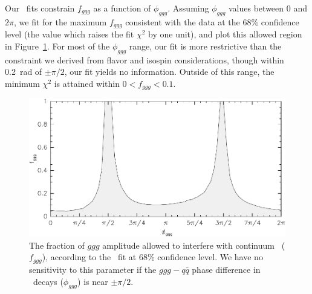 \documentclass{cornell}
\begin{document}
Our \us\ fits constrain $f_{ggg}$ as a function of $\phi_{ggg}$.
Assuming $\phi_{ggg}$ values between $0$ and $2\pi$, we fit for the
maximum $f_{ggg}$ consistent with the data at the 68\% confidence
level (the value which raises the fit $\chi^2$ by one unit), and plot
this allowed region in Figure~\ref{intconstraint}.  For most of the
$\phi_{ggg}$ range, our fit is more restrictive than the constraint we
derived from flavor and isospin considerations, though within 0.2~rad
of $\pm\pi/2$, our fit yields no information.  Outside of this range,
the minimum $\chi^2$ is attained within $0 < f_{ggg} < 0.1$.

\begin{figure}[p]
  \begin{center}
    \includegraphics[width=0.8\linewidth]{plots/intconstraint}
  \end{center}
  \caption[Upper limits on interference between Strong and
  Electromagnetic decays to hadrons]{\label{intconstraint} The fraction of $ggg$ amplitude
  allowed to interfere with continuum \qqbar\ ($f_{ggg}$), according
  to the \us\ fit at 68\% confidence level.  We have no sensitivity to
  this parameter if the $ggg - q\bar{q}$ phase difference in \ups\
  decays ($\phi_{ggg}$) is near $\pm\pi/2$.}
\end{figure}
\end{document}
